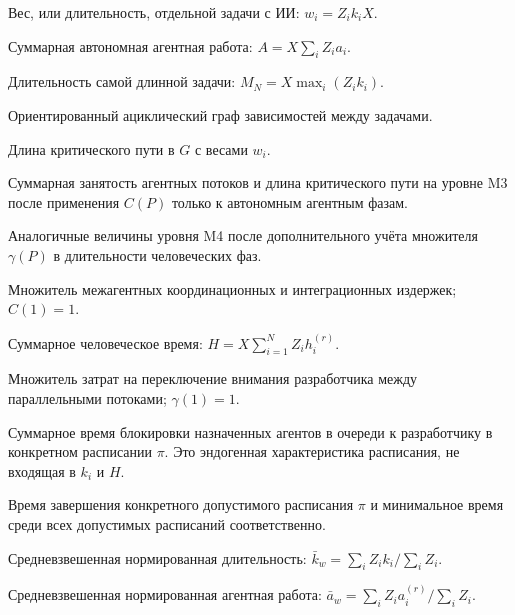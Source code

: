 \begin{description}[style=nextline]
  \item[$w_i$] Вес, или длительность, отдельной задачи с ИИ:
  $w_i=Z_i k_i X$.

  \item[$A$] Суммарная автономная агентная работа:
  $A=X\sum_i Z_i a_i$.

  \item[$M_N$] Длительность самой длинной задачи:
  $M_N=X\max_i(Z_i k_i)$.

  \item[$G=(V,E)$] Ориентированный ациклический граф зависимостей между
  задачами.

  \item[$L$] Длина критического пути в $G$ с весами $w_i$.

  \item[$W_3(P)$, $L_3(P)$] Суммарная занятость агентных потоков и длина
  критического пути на уровне M3 после применения $C(P)$ только к автономным
  агентным фазам.

  \item[$W_4(P)$, $L_4(P)$] Аналогичные величины уровня M4 после дополнительного
  учёта множителя $\gamma(P)$ в длительности человеческих фаз.

  \item[$C(P)$] Множитель межагентных координационных и интеграционных
  издержек; $C(1)=1$.

  \item[$H$] Суммарное человеческое время:
  $H=X\sum_{i=1}^{N}Z_i h_i^{(r)}$.

  \item[$\gamma(P)$] Множитель затрат на переключение внимания разработчика
  между параллельными потоками; $\gamma(1)=1$.

  \item[$Q(\pi)$] Суммарное время блокировки назначенных агентов в очереди к
  разработчику в конкретном расписании $\pi$. Это эндогенная характеристика
  расписания, не входящая в $k_i$ и $H$.

  \item[$T(\pi)$, $T^{*}$] Время завершения конкретного допустимого расписания
  $\pi$ и минимальное время среди всех допустимых расписаний соответственно.

  \item[$\bar{k}_w$] Средневзвешенная нормированная длительность:
  $\bar{k}_w=\sum_i Z_i k_i/\sum_i Z_i$.

  \item[$\bar{a}_w$] Средневзвешенная нормированная агентная работа:
  $\bar{a}_w=\sum_i Z_i a_i^{(r)}/\sum_i Z_i$.


\end{description}
